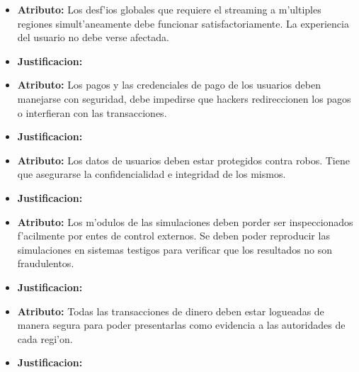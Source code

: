\begin{itemize}
\item \textbf{Atributo:} Los desf'ios globales que requiere el streaming a m'ultiples regiones simult'aneamente debe funcionar satisfactoriamente. La experiencia del usuario no debe verse afectada.
\item \textbf{Justificacion:}

\item \textbf{Atributo:} Los pagos y las credenciales de pago de los usuarios deben manejarse con seguridad, debe impedirse que hackers redireccionen los pagos o interfieran con las transacciones.
\item \textbf{Justificacion:}

\item \textbf{Atributo:} Los datos de usuarios deben estar protegidos contra robos. Tiene que asegurarse la confidencialidad e integridad de los mismos.
\item \textbf{Justificacion:}

\item \textbf{Atributo:} Los m'odulos de las simulaciones deben porder ser inspeccionados f'acilmente por entes de control externos. Se deben poder reproducir las simulaciones en sistemas testigos para verificar que los resultados no son fraudulentos.
\item \textbf{Justificacion:}

\item \textbf{Atributo:} Todas las transacciones de dinero deben estar logueadas de manera segura para poder presentarlas como evidencia a las autoridades de cada regi'on.
\item \textbf{Justificacion:}

\end{itemize}

